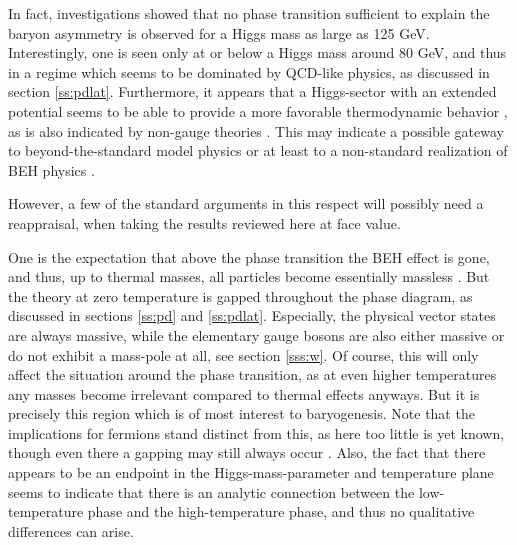 \documentclass[final,12pt,3p,longtitle]{elsarticle}
\newcommand*{\1}{1\!\!\!\bot}
\begin{document}
In fact, investigations \cite{Kajantie:1996mn,Csikor:1998ge} showed that no phase transition sufficient to explain the baryon asymmetry is observed for a Higgs mass as large as 125 GeV. Interestingly, one is seen only at or below a Higgs mass around 80 GeV, and thus in a regime which seems to be dominated by QCD-like physics, as discussed in section \ref{ss:pdlat}. Furthermore, it appears that a Higgs-sector with an extended potential seems to be able to provide a more favorable thermodynamic behavior \cite{Grojean:2004xa,Reichert:2017puo}, as is also indicated by non-gauge theories \cite{Chu:2017vmc,Hegde:2013mks,Akerlund:2015fya}. This may indicate a possible gateway to beyond-the-standard model physics or at least to a non-standard realization of BEH physics \cite{Reichert:2017puo}.

However, a few of the standard arguments in this respect will possibly need a reappraisal, when taking the results reviewed here at face value.

One is the expectation that above the phase transition the BEH effect is gone, and thus, up to thermal masses, all particles become essentially massless \cite{Kapusta:2006pm}. But the theory at zero temperature is gapped throughout the phase diagram, as discussed in sections \ref{ss:pd} and \ref{ss:pdlat}. Especially, the physical vector states are always massive, while the elementary gauge bosons are also either massive or do not exhibit a mass-pole at all, see section \ref{sss:w}. Of course, this will only affect the situation around the phase transition, as at even higher temperatures any masses become irrelevant compared to thermal effects anyways. But it is precisely this region which is of most interest to baryogenesis. Note that the implications for fermions stand distinct from this, as here too little is yet known, though even there a gapping may still always occur \cite{Iida:2007qp}. Also, the fact that there appears to be an endpoint in the Higgs-mass-parameter and temperature plane \cite{Kapusta:2006pm,Kajantie:1996mn,Csikor:1998ge} seems to indicate that there is an analytic connection between the low-temperature phase and the high-temperature phase, and thus no qualitative differences can arise.
\end{document}
